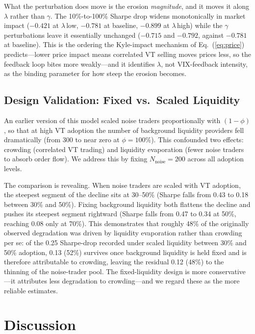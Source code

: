 \documentclass[12pt,a4paper]{article}
\begin{document}
What the perturbation does move is the erosion \emph{magnitude}, and it moves it along $\lambda$ rather than $\gamma$. The 10\%-to-100\% Sharpe drop widens monotonically in market impact ($-0.421$ at $\lambda$\,low, $-0.781$ at baseline, $-0.899$ at $\lambda$\,high) while the $\gamma$ perturbations leave it essentially unchanged ($-0.715$ and $-0.792$, against $-0.781$ at baseline). This is the ordering the Kyle-impact mechanism of Eq.~(\ref{eq:price}) predicts---lower price impact means correlated VT selling moves prices less, so the feedback loop bites more weakly---and it identifies $\lambda$, not VIX-feedback intensity, as the binding parameter for how steep the erosion becomes.

\subsection{Design Validation: Fixed vs.\ Scaled Liquidity}
\label{sec:validation}

An earlier version of this model scaled noise traders proportionally with $(1-\phi)$, so that at high VT adoption the number of background liquidity providers fell dramatically (from 300 to near zero at $\phi = 100\%$). This confounded two effects: crowding (correlated VT trading) and liquidity evaporation (fewer noise traders to absorb order flow). We address this by fixing $N_{\text{noise}} = 200$ across all adoption levels.

The comparison is revealing. When noise traders are scaled with VT adoption, the steepest segment of the decline sits at 30--50\% (Sharpe falls from 0.43 to 0.18 between 30\% and 50\%). Fixing background liquidity both flattens the decline and pushes its steepest segment rightward (Sharpe falls from 0.47 to 0.34 at 50\%, reaching 0.08 only at 70\%). This demonstrates that roughly 48\% of the originally observed degradation was driven by liquidity evaporation rather than crowding per se: of the 0.25 Sharpe-drop recorded under scaled liquidity between 30\% and 50\% adoption, 0.13 (52\%) survives once background liquidity is held fixed and is therefore attributable to crowding, leaving the residual 0.12 (48\%) to the thinning of the noise-trader pool. The fixed-liquidity design is more conservative---it attributes less degradation to crowding---and we regard these as the more reliable estimates.

\section{Discussion}
\label{sec:discussion}
\end{document}
